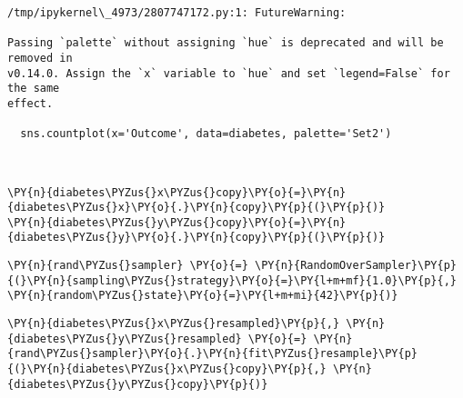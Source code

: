     \begin{Verbatim}[commandchars=\\\{\}]
/tmp/ipykernel\_4973/2807747172.py:1: FutureWarning:

Passing `palette` without assigning `hue` is deprecated and will be removed in
v0.14.0. Assign the `x` variable to `hue` and set `legend=False` for the same
effect.

  sns.countplot(x='Outcome', data=diabetes, palette='Set2')
    \end{Verbatim}

    \begin{center}
    \end{center}
    { \hspace*{\fill} \\}
    
    \begin{tcolorbox}[breakable, size=fbox, boxrule=1pt, pad at break*=1mm,colback=cellbackground, colframe=cellborder]
\begin{Verbatim}[commandchars=\\\{\}]
\PY{n}{diabetes\PYZus{}x\PYZus{}copy}\PY{o}{=}\PY{n}{diabetes\PYZus{}x}\PY{o}{.}\PY{n}{copy}\PY{p}{(}\PY{p}{)}
\PY{n}{diabetes\PYZus{}y\PYZus{}copy}\PY{o}{=}\PY{n}{diabetes\PYZus{}y}\PY{o}{.}\PY{n}{copy}\PY{p}{(}\PY{p}{)}
\end{Verbatim}
\end{tcolorbox}

    \begin{tcolorbox}[breakable, size=fbox, boxrule=1pt, pad at break*=1mm,colback=cellbackground, colframe=cellborder]
\begin{Verbatim}[commandchars=\\\{\}]
\PY{n}{rand\PYZus{}sampler} \PY{o}{=} \PY{n}{RandomOverSampler}\PY{p}{(}\PY{n}{sampling\PYZus{}strategy}\PY{o}{=}\PY{l+m+mf}{1.0}\PY{p}{,} \PY{n}{random\PYZus{}state}\PY{o}{=}\PY{l+m+mi}{42}\PY{p}{)}
\end{Verbatim}
\end{tcolorbox}

    \begin{tcolorbox}[breakable, size=fbox, boxrule=1pt, pad at break*=1mm,colback=cellbackground, colframe=cellborder]
\begin{Verbatim}[commandchars=\\\{\}]
\PY{n}{diabetes\PYZus{}x\PYZus{}resampled}\PY{p}{,} \PY{n}{diabetes\PYZus{}y\PYZus{}resampled} \PY{o}{=} \PY{n}{rand\PYZus{}sampler}\PY{o}{.}\PY{n}{fit\PYZus{}resample}\PY{p}{(}\PY{n}{diabetes\PYZus{}x\PYZus{}copy}\PY{p}{,} \PY{n}{diabetes\PYZus{}y\PYZus{}copy}\PY{p}{)}
\end{Verbatim}
\end{tcolorbox}

